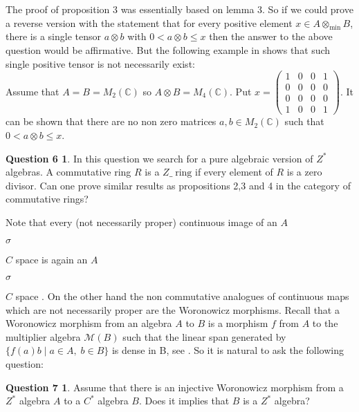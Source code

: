 \documentclass[a4paper,10pt]{amsart}
\theoremstyle{definition}
\newtheorem*{question6} {Question  6}
\newtheorem*{question7} {Question  7}
\theoremstyle{plain}
\begin{document}
 The proof of proposition 3 was essentially based on lemma 3. So if we could prove a reverse version with the statement  that for every positive element $x\in A \otimes_{\text{min}} B$, there is  a single tensor $a\otimes b$ with $0< a\otimes b \leq x$ then the answer to the above question would be affirmative. But the following example in \cite{Math}  shows that such single positive  tensor is not necessarily exist:\\
 Assume that  $A=B=M_{2}(\mathbb{C})$ so $A \otimes B=M_{4}(\mathbb{C})$.
 Put $x=\left(\begin{smallmatrix}1&0&0&1\\0&0&0&0\\0&0&0&0\\1&0&0&1 \end{smallmatrix}\right)$. It can be shown that there are no non zero matrices $a,b\in  M_{2}(\mathbb{C})$ such that $0< a\otimes b \leq x$.\\
 \begin{question6}
 In this question we search for  a pure algebraic version of $Z^{*}$ algebras.  A commutative ring $R$ is  a $Z\_\; \text{ring}$ if every element of $R$ is  a zero divisor. Can one prove  similar results as propositions 2,3 and 4 in the category of  commutative rings?
 \end{question6}
Note  that every (not necessarily proper)  continuous  image of  an $A$\begin{Large}${\sigma}$\end{Large}$C$ space is  again an $A$\begin{Large}${\sigma}$\end{Large}$C$  space . On the  other  hand the  non commutative  analogues of continuous maps which are not necessarily  proper are the  Woronowicz morphisms. Recall that a Woronowicz morphism from  an algebra $A$ to $B$ is  a morphism $f$ from $A$ to the  multiplier algebra $\mathcal{M}(B)$  such that the  linear span generated by $\{f(a)b \mid a\in A,\;b\in B \}$ is  dense in B, see \cite[page 15]{E}. So it is  natural to ask the  following question:
\begin{question7}
Assume that there is an injective Woronowicz morphism from  a  $Z^{*}$  algebra $A$ to a  $C^{*}$  algebra $B$. Does it implies that $B$ is  a  $Z^{*}$  algebra?
\end{question7}
\end{document}
